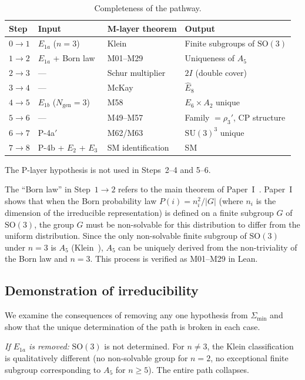 \documentclass[sn-mathphys-num,Numbered]{sn-jnl}
\theoremstyle{thmstyleone}
\theoremstyle{thmstylethree}
\newcommand{\Amin}{\Sigma_{\min}}
\newcommand{\Ngen}{N_{\mathrm{gen}}}
\newcommand{\SU}{\mathrm{SU}}
\newcommand{\SO}{\mathrm{SO}}
\newcommand{\Ehat}{\hat{E}}
\begin{document}
\begin{table}[htb]
\centering
\caption{Completeness of the pathway.}\label{tab:completeness}
\begin{tabular}{llll}
\toprule
Step & Input & M-layer theorem & Output \\
\midrule
$0 \to 1$ & $E_{1a}$ ($n = 3$) & Klein~\cite{Klein1884} & Finite subgroups of $\SO(3)$ \\
$1 \to 2$ & $E_{1a}$ + Born law~\cite{Paper1} & M01--M29 & Uniqueness of $A_5$ \\
$2 \to 3$ & --- & Schur multiplier & $2I$ (double cover) \\
$3 \to 4$ & --- & McKay~\cite{McKay1980} & $\Ehat_8$ \\
$4 \to 5$ & $E_{1b}$ ($\Ngen = 3$) & M58 & $E_6 \times A_2$ unique \\
$5 \to 6$ & --- & M49--M57 & Family $= \rho_3'$, CP structure \\
$6 \to 7$ & P-4a$'$ & M62/M63 & $\SU(3)^3$ unique \\
$7 \to 8$ & P-4b + $E_2$ + $E_3$ & SM identification & SM \\
\bottomrule
\end{tabular}
\end{table}

The P-layer hypothesis is not used in Steps~2--4 and 5--6.

The ``Born law'' in Step~$1 \to 2$ refers to the main theorem of
Paper~I~\cite{Paper1}.  Paper~I shows that when the Born probability law
$P(i) = n_i^2/|G|$ (where $n_i$ is the dimension of the irreducible
representation) is defined on a finite subgroup $G$ of $\SO(3)$, the group $G$
must be non-solvable for this distribution to differ from the uniform
distribution.  Since the only non-solvable finite subgroup of $\SO(3)$ under
$n = 3$ is $A_5$ (Klein~\cite{Klein1884}), $A_5$ can be uniquely derived from the
non-triviality of the Born law and $n = 3$.  This process is verified as
M01--M29 in Lean.


\subsection{Demonstration of irreducibility}\label{sec:irreducibility}

We examine the consequences of removing any one hypothesis from $\Amin$ and
show that the unique determination of the path is broken in each case.

\emph{If $E_{1a}$ is removed:} $\SO(3)$ is not determined.  For $n \neq 3$,
the Klein classification is qualitatively different (no non-solvable group for
$n = 2$, no exceptional finite subgroup corresponding to $A_5$ for $n \geq 5$).
The entire path collapses.
\end{document}
